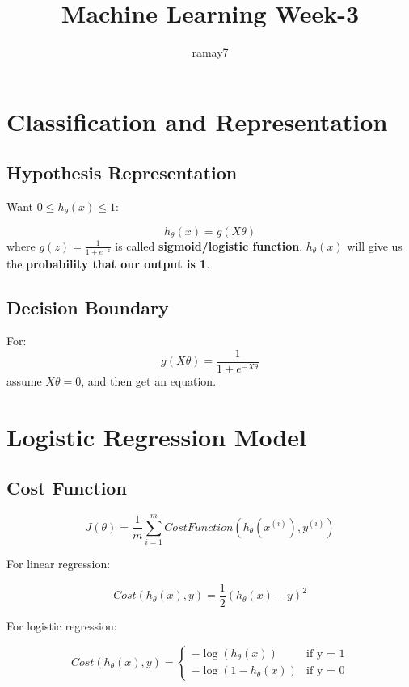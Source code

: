 \documentclass[11pt]{article}
\begin{document}
	\title{Machine Learning Week-3}
	\author{ramay7}
	
	\maketitle %
	\tableofcontents %
	
	\section{Classification and Representation}
		
		\subsection{Hypothesis Representation}
		Want $0\leq h_{\theta}(x) \leq 1$:
		
		$$
		h_{\theta}(x) = g(X\theta)
		$$
		where $g(z) = \frac{1}{1+e^{-z}}$ is called \textbf{sigmoid/logistic function}. $h_{\theta}(x)$ will give us the \textbf{probability that our output is 1}.
		
		\subsection{Decision Boundary}
		For:
		$$g(X\theta)=\frac{1}{1+e^{-X\theta}}$$
		assume $X\theta = 0$, and then get an equation.
	
	\section{Logistic Regression Model}
		
		\subsection{Cost Function}
			$$
			J(\theta) = \frac{1}{m}\sum_{i=1}^{m}CostFunction(h_{\theta}(x^{(i)}) ,y^{(i)})
			$$
			
			For linear regression:
			
			$$Cost(h_{\theta}(x) ,y) = \frac{1}{2}(h_{\theta}(x) - y)^2$$
			
			For logistic regression:
			
			\begin{equation}
				Cost(h_{\theta}(x) ,y)=
				\begin{cases}
			
					-\log(h_{\theta}(x)) &\mbox{if y = 1} \\
			
					-\log(1- h_{\theta}(x)) &\mbox{if y = 0}
			
				\end{cases}
			\end{equation}
			
\end{document}
